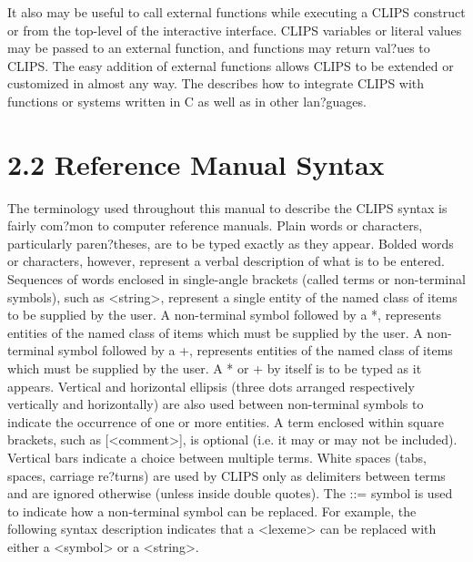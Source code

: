 \documentclass[letterpaper,10pt,english]{sphinxmanual}
\begin{document}
It also may be useful to call external functions while executing a CLIPS
construct or from the top-level of the interactive interface. CLIPS
variables or literal values may be passed to an external function, and
functions may return val?ues to CLIPS. The easy addition of external
functions allows CLIPS to be extended or customized in almost any way.
The  describes how to integrate CLIPS with
functions or systems written in C as well as in other lan?guages.


\section{2.2 Reference Manual Syntax}
\label{\detokenize{overview:reference-manual-syntax}}
The terminology used throughout this manual to describe the CLIPS syntax
is fairly com?mon to computer reference manuals. Plain words or
characters, particularly paren?theses, are to be typed exactly as they
appear. Bolded words or characters, however, represent a verbal
description of what is to be entered. Sequences of words enclosed in
single-angle brackets (called terms or non-terminal symbols), such as
\textless{}string\textgreater{}, represent a single entity of the named class of items to be
supplied by the user. A non-terminal symbol followed by a *, represents
 entities of the named class of items which must be
supplied by the user. A non-terminal symbol followed by a +, represents
 entities of the named class of items which must be
supplied by the user. A * or + by itself is to be typed as it appears.
Vertical and horizontal ellipsis (three dots arranged respectively
vertically and horizontally) are also used between non-terminal symbols
to indicate the occurrence of one or more entities. A term enclosed
within square brackets, such as {[}\textless{}comment\textgreater{}{]}, is optional (i.e. it may or
may not be included). Vertical bars indicate a choice between multiple
terms. White spaces (tabs, spaces, carriage re?turns) are used by CLIPS
only as delimiters between terms and are ignored otherwise (unless
inside double quotes). The ::= symbol is used to indicate how a
non-terminal symbol can be replaced. For example, the following syntax
description indicates that a \textless{}lexeme\textgreater{} can be replaced with either a
\textless{}symbol\textgreater{} or a \textless{}string\textgreater{}.

\begin{sphinxVerbatim}[commandchars=\\\{\}]
    
\end{sphinxVerbatim}
\end{document}

